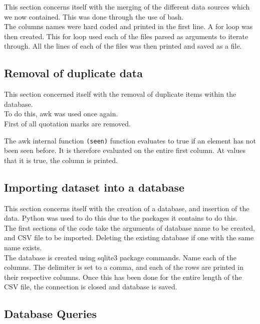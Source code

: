 \documentclass{article}
\begin{document}
This section concerns itself with the merging of the different data sources which we now contained. This was done through the use of bash.\\

The columns names were hard coded and printed in the first line. A for loop was then created. This for loop used each of the files parsed as arguments to iterate through. All the lines of each of the files was then printed and saved as a file.

\subsection*{Removal of duplicate data}

This section concerned itself with the removal of duplicate items within the database. \\

To do this, awk was used once again. \\

First of all quotation marks are removed.

The awk internal function \lstinline|(seen)| function evaluates to true if an element has not been seen before. It is therefore evaluated on the entire first column. At values that it is true, the column is printed.

\subsection*{Importing dataset into a database}

This section concerns itself with the creation of a database, and insertion of the data. Python was used to do this due to the packages it contains to do this.\\

The first sections of the code take the arguments of database name to be created, and CSV file to be imported. Deleting the existing database if one with the same name exists.\\

The database is created using sqlite3 package commands. Name each of the columns. The delimiter is set to a comma, and each of the rows are printed in their respective columns. Once this has been done for the entire length of the CSV file, the connection is closed and database is saved.

\subsection*{Database Queries}
\end{document}
